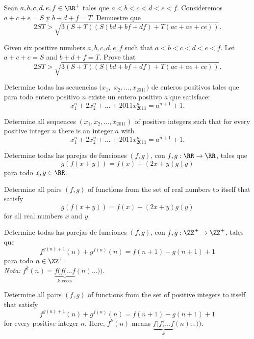 \begin{probMR}[ISL 2010/A8]
	Sean $a,b,c,d,e,f\in\RR^+$ tales que $a<b<c<d<e<f$. Consideremos $a+c+e=S$ y $b+d+f=T$. Demuestre que
	\[2ST>\sqrt{3(S+T)\left(S(bd+bf+df)+T(ac+ae+ce)\right)}.\]
	\begin{hint}
		Given six positive numbers $a,b,c,d,e,f$ such that $a<b<c<d<e<f$. Let $a+c+e=S$ and $b+d+f=T$. Prove that
		\[2ST>\sqrt{3(S+T)\left(S(bd+bf+df)+T(ac+ae+ce)\right)}.\]
	\end{hint}
\end{probMR}

\begin{probEG}[ISL 2011/A2]
	Determine todas las secuencias $(x_1,$ $x_2,\dots,x_{2011})$ de enteros positivos tales que para todo entero positivo $n$ existe un entero positivo $a$ que satisface:
	\[x_1^n+2x_2^n+\dots+2011x_{2011}^n=a^{n+1}+1.\]
	\begin{hint}
		Determine all sequences $(x_1,x_2,\dots,x_{2011})$ of positive integers such that for every positive integer $n$ there is an integer $a$ with
		\[x_1^n+2x_2^n+\dots+2011x_{2011}^n=a^{n+1}+1.\]
	\end{hint}
\end{probEG}

\begin{probMG}[ISL 2011/A3]
	Determine todas las parejas de funciones $(f,g)$, con $f,g:\RR\to\RR$, tales que
	\[g(f(x+y))=f(x)+(2x+y)g(y)\]
	para todo $x,y\in\RR$.
	\begin{hint}
		Determine all pairs $(f,g)$ of functions from the set of real numbers to itself that satisfy
		\[g(f(x+y))=f(x)+(2x+y)g(y)\]
		for all real numbers $x$ and $y$.
	\end{hint}
\end{probMG}

\begin{problem}[ISL 2011/A4]
	Determine todas las parejas de funciones $(f,g)$, con $f,g:\ZZ^+\to\ZZ^+$, tales que
	\[f^{g(n)+1}(n)+g^{f(n)}(n)=f(n+1)-g(n+1)+1\]
	para todo $n\in\ZZ^+$.\\[4pt]
	\emph{Nota:} $f^k(n)=\underbrace{f(f(\dots f}_{k\text{ veces}}(n)\dots))$.
	\begin{hint}
		Determine all pairs $(f,g)$ of functions from the set of positive integers to itself that satisfy
		\[f^{g(n)+1}(n)+g^{f(n)}(n)=f(n+1)-g(n+1)+1\]
		for every positive integer $n$. Here, $f^k(n)$ means $\underbrace{f(f(\dots f}_k(n)\dots))$.
	\end{hint}
\end{problem}

